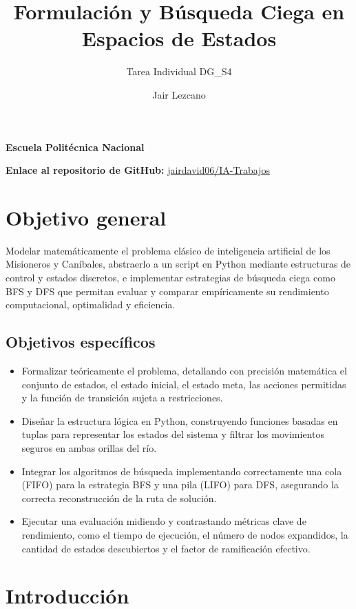 \documentclass[
  spanish,
  11pt,
]{article}
\title{Formulación y Búsqueda Ciega en Espacios de Estados}
\subtitle{Tarea Individual DG\_S4}
\author{Jair Lezcano}
\date{}
\providecommand{\tightlist}{%
  \setlength{\itemsep}{0pt}\setlength{\parskip}{0pt}}
\begin{document}
\maketitle


\textbf{Escuela Politécnica Nacional}

\textbf{Enlace al repositorio de GitHub:}
\href{https://github.com/jairdavid06/IA-Trabajos}{jairdavid06/IA-Trabajos}

\section{Objetivo general}\label{objetivo-general}

Modelar matemáticamente el problema clásico de inteligencia artificial
de los Misioneros y Caníbales, abstraerlo a un script en Python mediante
estructuras de control y estados discretos, e implementar estrategias de
búsqueda ciega como BFS y DFS que permitan evaluar y comparar
empíricamente su rendimiento computacional, optimalidad y eficiencia.

\subsection{Objetivos específicos}\label{objetivos-especuxedficos}

\begin{itemize}
\tightlist
\item
  Formalizar teóricamente el problema, detallando con precisión
  matemática el conjunto de estados, el estado inicial, el estado meta,
  las acciones permitidas y la función de transición sujeta a
  restricciones.
\item
  Diseñar la estructura lógica en Python, construyendo funciones basadas
  en tuplas para representar los estados del sistema y filtrar los
  movimientos seguros en ambas orillas del río.
\item
  Integrar los algoritmos de búsqueda implementando correctamente una
  cola (FIFO) para la estrategia BFS y una pila (LIFO) para DFS,
  asegurando la correcta reconstrucción de la ruta de solución.
\item
  Ejecutar una evaluación midiendo y contrastando métricas clave de
  rendimiento, como el tiempo de ejecución, el número de nodos
  expandidos, la cantidad de estados descubiertos y el factor de
  ramificación efectivo.
\end{itemize}

\section{Introducción}\label{introducciuxf3n}
\end{document}
